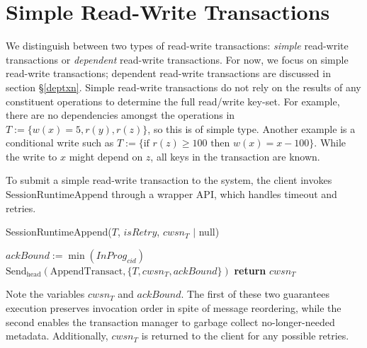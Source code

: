 \documentclass{article}
\begin{document}
\section{Simple Read-Write Transactions} \label{wotxn}
\par We distinguish between two types of read-write transactions: \emph{simple} read-write transactions or \emph{dependent} read-write transactions. For now, we focus on simple read-write transactions; dependent read-write transactions are discussed in section \S \ref{deptxn}. Simple read-write transactions do not rely on the results of any constituent operations to determine the full read/write key-set. For example, there are no dependencies amongst the operations in $T := \{ w(x) = 5, r(y), r(z)\}$, so this is of simple type. Another example is a conditional write such as $T:=\{\text{if } r(z) \geq 100 \text{ then } w(x) = x - 100 \}$. While the write to $x$ might depend on $z$, all keys in the transaction are known.
\par To submit a simple read-write transaction to the system, the client invokes $\text{SessionRuntimeAppend}$ through a wrapper API, which handles timeout and retries. \\
\begin{procedure}[H]
  \caption{SessionRuntimeAppend($T$, $isRetry$, $cwsn_T$ $|$   null)}
  $ackBound := \min(InProg_{cid})$  
  $\text{Send}_{\text{head}}(\text{AppendTransact}, \{T, cwsn_T, ackBound\})$  
  \textbf{return} $cwsn_T$
\end{procedure}
Note the variables $cwsn_T$ and $ackBound$. The first of these two guarantees execution preserves invocation order in spite of message reordering, while the second enables the transaction manager to garbage collect no-longer-needed metadata. Additionally, $cwsn_T$ is returned to the client for any possible retries. \\
\end{document}
